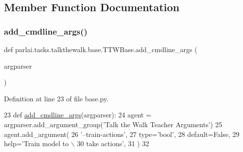 \subsection{Member Function Documentation}
\mbox{\label{classparlai_1_1tasks_1_1talkthewalk_1_1base_1_1TTWBase_a58e285e5ba5843219867ad14512bde8a}} 
\subsubsection{\texorpdfstring{add\+\_\+cmdline\+\_\+args()}{add\_cmdline\_args()}}
{\footnotesize\ttfamily def parlai.\+tasks.\+talkthewalk.\+base.\+T\+T\+W\+Base.\+add\+\_\+cmdline\+\_\+args (\begin{DoxyParamCaption}\item[{}]{argparser }\end{DoxyParamCaption})\hspace{0.3cm}{\ttfamily [static]}}



Definition at line 23 of file base.\+py.


\begin{DoxyCode}
23     \textcolor{keyword}{def }\hyperlink{namespaceparlai_1_1agents_1_1drqa_1_1config_a62fdd5554f1da6be0cba185271058320}{add\_cmdline\_args}(argparser):
24         agent = argparser.add\_argument\_group(\textcolor{stringliteral}{'Talk the Walk Teacher Arguments'})
25         agent.add\_argument(
26             \textcolor{stringliteral}{'--train-actions'},
27             type=\textcolor{stringliteral}{'bool'},
28             default=\textcolor{keyword}{False},
29             help=\textcolor{stringliteral}{'Train model to \(\backslash\)}
30 \textcolor{stringliteral}{                           take actions'},
31         )
32 
\end{DoxyCode}
\mbox{\label{classparlai_1_1tasks_1_1talkthewalk_1_1base_1_1TTWBase_adda57628371cdbb1afef6f297dab7c54}} 
